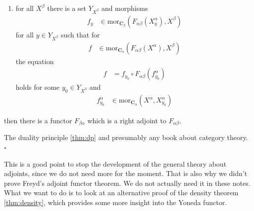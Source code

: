 \begin{thm}[Freyd]
\begin{enumerate}
\begin{enumerate}
\item[(SSC$^\prime$)]
for all $X^{\beta}$ there is a set $Y_{X^{\beta}}$ and morphisms
\begin{align*}
  f_{y}
  &\in
  \mathrm{mor}_{\mathbf{C}_{\beta}}
  \left(
    F_{\alpha\beta}(X_{y}^{\alpha}),
    X^{\beta}
  \right)
\end{align*}
for all $y \in Y_{X^{\beta}}$ such that for
\begin{align*}
  f
  &\in
  \mathrm{mor}_{\mathbf{C}_{\alpha}}
  \left(
    F_{\alpha\beta}(X^{\alpha}),
    X^{\beta}
  \right)
\end{align*}
the equation
\begin{align*}
  f
  &=
  f_{y_{0}}
  \circ
  F_{\alpha\beta}(f_{y_{0}}^{\alpha})
\end{align*}
holds for some $y_{0} \in Y_{X^{\beta}}$ and
\begin{align*}
  f_{y_{0}}^{\alpha}
  &\in
  \mathrm{mor}_{\mathbf{C}_{\alpha}}
  \left(
    X^{\alpha},
    X_{y_{0}}^{\alpha}
  \right)
\end{align*}
\end{enumerate}
then there is a functor $F_{\beta\alpha}$ which is a right adjoint to $F_{\alpha\beta}$.
\end{enumerate}
\end{thm}
\begin{prf}
The duality principle \ref{thm:dp} and presumably any book about category theory.
\\
\phantom{proven}
\hfill
$\square$
\end{prf}
This is a good point to stop the development of the general theory about adjoints, since we do not need more for the moment.
That is also why we didn't prove Freyd's adjoint functor theorem.
We do not actually need it in these notes.
What we want to do is to look at an alternative proof of the density theorem \ref{thm:density}, which provides some more insight into the Yoneda functor.
